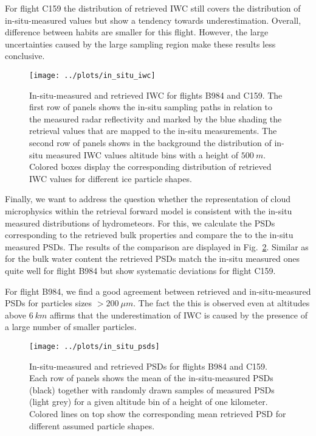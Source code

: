 \documentclass[journal abbreviation, manuscript]{copernicus}
\begin{document}
For flight C159 the distribution of retrieved IWC still covers the distribution
of in-situ-measured values but show a tendency towards underestimation. Overall,
difference between habits are smaller for this flight. However, the large
uncertainties caused by the large sampling region make these results less
conclusive.

\begin{figure}[!hbpt]
  \centering
  \texttt{[image: ../plots/in\_situ\_iwc]}
  \caption{In-situ-measured and retrieved IWC for flights B984
    and C159. The first row of panels shows the in-situ sampling paths in
    relation to the measured radar reflectivity and marked by the
    blue shading the retrieval values that are mapped to the
    in-situ measurements. The second row of panels shows in the background
    the distribution of in-situ measured IWC values altitude bins with
    a height of $500\ \unit{m}$. Colored boxes display the corresponding
    distribution of retrieved IWC values for different ice particle shapes.}
  \label{fig:in_situ_iwc}
\end{figure}

Finally, we want to address the question whether the representation of cloud
microphysics within the retrieval forward model is consistent with the in-situ
measured distributions of hydrometeors. For this, we calculate the PSDs
corresponding to the retrieved bulk properties and compare the to the in-situ
measured PSDs. The results of the comparison are displayed in
Fig.~\ref{fig:in_situ_psds}. Similar as for the bulk water content the retrieved
PSDs match the in-situ measured ones quite well for flight B984 but show
systematic deviations for flight C159.

For flight B984, we find a good agreement between retrieved and in-situ-measured
PSDs for particles sizes $> 200 \ \unit{\mu m}$. The fact the this is observed
even at altitudes above $6 \ \unit{km}$ affirms that the underestimation of
IWC is caused by the presence of a large number of smaller particles.

\begin{figure}[!hbpt]
  \centering
  \texttt{[image: ../plots/in\_situ\_psds]}
  \caption{In-situ-measured and retrieved PSDs for flights B984
    and C159. Each row of panels shows the mean of the in-situ-measured
    PSDs (black) together with randomly drawn samples of measured PSDs
    (light grey) for a given altitude bin of a height of one kilometer.
    Colored lines on top show the corresponding mean retrieved PSD for
    different assumed particle shapes.}
  \label{fig:in_situ_psds}
\end{figure}
\end{document}
